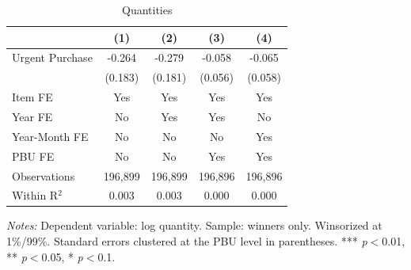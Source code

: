 \begin{table}[ht]
  \centering
  \caption{Quantities}
  \label{tab:quantities}
  \small
  \begin{threeparttable}
  \begin{tabular}{lcccc}
    \hline\hline
    & (1) & (2) & (3) & (4) \\
    \hline
    Urgent Purchase & -0.264 & -0.279 & -0.058 & -0.065 \\
     & (0.183) & (0.181) & (0.056) & (0.058) \\[3pt]
    \hline
    Item FE & Yes & Yes & Yes & Yes \\
    Year FE & No & Yes & Yes & No \\
    Year-Month FE & No & No & No & Yes \\
    PBU FE & No & No & Yes & Yes \\
    Observations & 196,899 & 196,899 & 196,896 & 196,896 \\
    Within R$^2$ & 0.003 & 0.003 & 0.000 & 0.000 \\
    \hline\hline
  \end{tabular}
  \begin{tablenotes}
    \small
    \item \textit{Notes:} Dependent variable: log quantity. Sample: winners only. Winsorized at 1\%/99\%. Standard errors clustered at the PBU level in parentheses. *** \textit{p}$<$0.01, ** \textit{p}$<$0.05, * \textit{p}$<$0.1.
  \end{tablenotes}
  \end{threeparttable}
\end{table}
